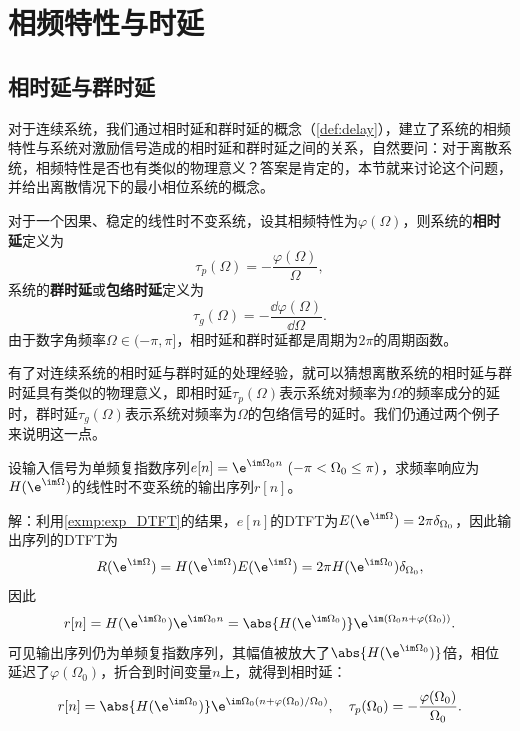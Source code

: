 \section{相频特性与时延}\label{sec:discrete_system_delay}

\subsection{相时延与群时延}\label{sub:phase_group_delay}

对于连续系统，我们通过相时延和群时延的概念（\cref{def:delay}），建立了系统的相频特性与系统对激励信号造成的相时延和群时延之间的关系，自然要问：对于离散系统，相频特性是否也有类似的物理意义？答案是肯定的，本节就来讨论这个问题，并给出离散情况下的最小相位系统的概念。

\begin{definition}[相时延与群时延]
    对于一个因果、稳定的线性时不变系统，设其相频特性为$\varphi(\Omega)$，则系统的\textbf{相时延}定义为
    \begin{equation}
        \tau_p(\Omega)=-\frac{\varphi(\Omega)}{\Omega},
    \end{equation}
    系统的\textbf{群时延}或\textbf{包络时延}定义为
    \begin{equation}
        \tau_g(\Omega)=-\frac{\dd\varphi(\Omega)}{\dd\Omega}.
    \end{equation}
    由于数字角频率$\Omega\in(-\pi,\pi]$，相时延和群时延都是周期为$2\pi$的周期函数。
\end{definition}

有了对连续系统的相时延与群时延的处理经验，就可以猜想离散系统的相时延与群时延具有类似的物理意义，即相时延$\tau_p(\Omega)$表示系统对频率为$\Omega$的频率成分的延时，群时延$\tau_g(\Omega)$表示系统对频率为$\Omega$的包络信号的延时。我们仍通过两个例子来说明这一点。

\begin{example}[相时延]
    设输入信号为单频复指数序列$e[n]=\e^{\im\Omega_0 n}\ (-\pi<\Omega_0\leq\pi)$，求频率响应为$H(\e^{\im\Omega})$的线性时不变系统的输出序列$r[n]$。

    解：利用\cref{exmp:exp_DTFT}的结果，$e[n]$的DTFT为$E(\e^{\im\Omega})=2\pi\delta_{\Omega_0}$，因此输出序列的DTFT为
    \begin{equation}
        R(\e^{\im\Omega})=H(\e^{\im\Omega})E(\e^{\im\Omega})=2\pi H(\e^{\im\Omega_0})\delta_{\Omega_0},
    \end{equation}
    因此
    \begin{equation}
        r[n]=H(\e^{\im\Omega_0})\e^{\im\Omega_0 n}=\abs{H(\e^{\im\Omega_0})}\e^{\im(\Omega_0 n+\varphi(\Omega_0))}.
    \end{equation}
    可见输出序列仍为单频复指数序列，其幅值被放大了$\abs{H(\e^{\im\Omega_0})}$倍，相位延迟了$\varphi(\Omega_0)$，折合到时间变量$n$上，就得到相时延：
    \begin{equation}
        r[n]=\abs{H(\e^{\im\Omega_0})}\e^{\im\Omega_0 (n+\varphi(\Omega_0)/\Omega_0)},\quad \tau_p(\Omega_0)=-\frac{\varphi(\Omega_0)}{\Omega_0}.
    \end{equation}
\end{example}


